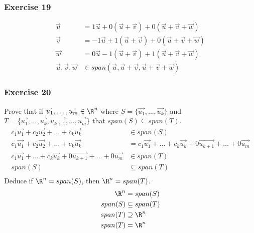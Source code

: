 \documentclass[letterpaper, 12pt]{math}
\begin{document}
\subsubsection*{Exercise 19}
\begin{align*}
  \vec{u} &= 1\vec{u}+0(\vec{u}+\vec{v})+0(\vec{u}+\vec{v}+\vec{w}) \\
  \vec{v} &= -1\vec{u}+1(\vec{u}+\vec{v})+0(\vec{u}+\vec{v}+\vec{w}) \\
  \vec{w} &= 0\vec{u}-1(\vec{u}+\vec{v})+1(\vec{u}+\vec{v}+\vec{w}) \\
  \vec{u},\vec{v},\vec{w} &\in
    span(\vec{u},\vec{u}+\vec{v},\vec{u}+\vec{v}+\vec{w})
\end{align*}

\subsubsection*{Exercise 20}
Prove that if \( \vec{u_1},\dots,\vec{u_m}\in\R^n \) where \( S = \{\vec{u_1},
\dots,\vec{u_k}\} \) and \( T = \{\vec{u_1},\dots,\vec{u_k},\vec{u_{k+1}},\dots,
\vec{u_m}\} \) that \( span(S)\subseteq span(T) \).
\begin{align*}
  c_1\vec{u_1}+c_2\vec{u_2}+\dots+c_k\vec{u_k} &\in span(S) \\
  c_1\vec{u_1}+c_2\vec{u_2}+\dots+c_k\vec{u_k} &=
    c_1\vec{u_1}+\dots+c_k\vec{u_k}+0\vec{u_{k+1}}+\dots+0\vec{u_m} \\
  c_1\vec{u_1}+\dots+c_k\vec{u_k}+0\vec{u_{k+1}}+\dots+0\vec{u_m} &\in
    span(T) \\
  span(S) &\subseteq span(T) \\
\end{align*}
Deduce if \( \R^n = span(S) \), then \( \R^n = span(T) \).
\begin{align*}
  \R^n &= span(S) \\
  span(S) &\subseteq span(T) \\
  span(T) &\supseteq \R^n \\
  span(T) &= \R^n \\
\end{align*}
\end{document}
